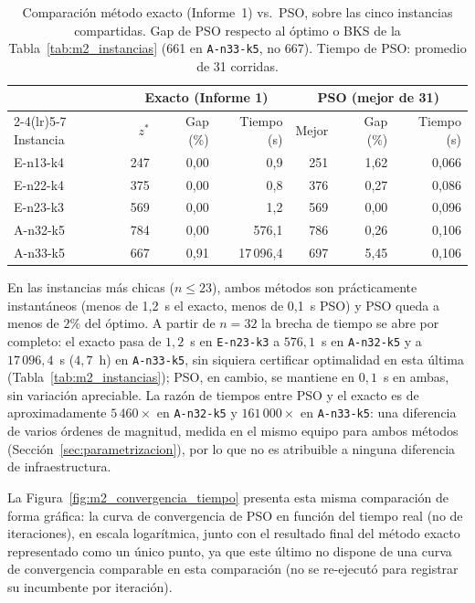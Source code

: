 \begin{table}[H]
\centering
\caption{Comparación método exacto (Informe~1) vs.\ PSO, sobre las cinco instancias
compartidas. Gap de PSO respecto al óptimo o BKS de la Tabla~\ref{tab:m2_instancias}
(661 en \texttt{A-n33-k5}, no 667). Tiempo de PSO: promedio de 31 corridas.}
\label{tab:m2_comparacion}
\begin{tabular}{lrrrrrr}
\hline
 & \multicolumn{3}{c}{Exacto (Informe 1)} & \multicolumn{3}{c}{PSO (mejor de 31)} \\
\cmidrule(lr){2-4}\cmidrule(lr){5-7}
Instancia & $z^{*}$ & Gap (\%) & Tiempo (s) & Mejor & Gap (\%) & Tiempo (s) \\
\hline
E-n13-k4  & 247 & 0{,}00 & 0{,}9       & 251 & 1{,}62 & 0{,}066 \\
E-n22-k4  & 375 & 0{,}00 & 0{,}8       & 376 & 0{,}27 & 0{,}086 \\
E-n23-k3  & 569 & 0{,}00 & 1{,}2       & 569 & 0{,}00 & 0{,}096 \\
A-n32-k5  & 784 & 0{,}00 & 576{,}1     & 786 & 0{,}26 & 0{,}106 \\
A-n33-k5  & 667 & 0{,}91 & 17\,096{,}4 & 697 & 5{,}45 & 0{,}106 \\
\hline
\end{tabular}
\end{table}

En las instancias más chicas ($n\le23$), ambos métodos son prácticamente instantáneos
(menos de 1{,}2~s el exacto, menos de 0{,}1~s PSO) y PSO queda a menos de $2\%$ del
óptimo. A partir de $n=32$ la brecha de tiempo se abre por completo: el exacto pasa de
$1{,}2$~s en \texttt{E-n23-k3} a $576{,}1$~s en \texttt{A-n32-k5} y a $17\,096{,}4$~s
($4{,}7$~h) en \texttt{A-n33-k5}, sin siquiera certificar optimalidad en esta última
(Tabla~\ref{tab:m2_instancias}); PSO, en cambio, se mantiene en $0{,}1$~s en ambas,
sin variación apreciable. La razón de tiempos entre PSO y el exacto es de
aproximadamente $5\,460\times$ en \texttt{A-n32-k5} y $161\,000\times$ en
\texttt{A-n33-k5}: una diferencia de varios órdenes de magnitud, medida en el mismo
equipo para ambos métodos (Sección~\ref{sec:parametrizacion}), por lo que no es
atribuible a ninguna diferencia de infraestructura.

La Figura~\ref{fig:m2_convergencia_tiempo} presenta esta misma comparación de forma
gráfica: la curva de convergencia de PSO en función del tiempo real (no de iteraciones),
en escala logarítmica, junto con el resultado final del método exacto representado como
un único punto, ya que este último no dispone de una curva de convergencia comparable en
esta comparación (no se re-ejecutó para registrar su incumbente por iteración).


